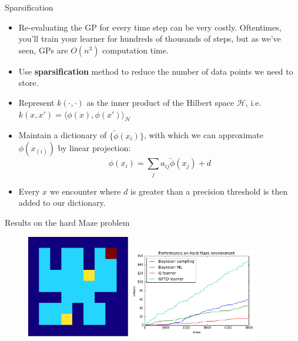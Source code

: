 \documentclass{beamer}
\begin{document}
\begin{frame}{Sparsification \cite{engel}}

\begin{itemize}
\item Re-evaluating the GP for every time step can be very costly. Oftentimes, you'll train your learner for hundreds of thousands of steps, but as we've seen, GPs are $O(n^3)$ computation time.
\item Use \textbf{sparsification} method to reduce the number of data points we need to store.
\item Represent $k(\cdot, \cdot)$ as the inner product of the Hilbert space $\mathcal{H}$, i.e.
$k(x, x') = \langle \phi(x), \phi(x') \rangle_{\mathcal{H}}$
\item Maintain
a dictionary of $\{\tilde{\phi}(x_i)\}$, with which we can approximate $\phi(x_{(i)})$ by linear projection:
$$\phi(x_i) = \sum_j a_{ij} \tilde{\phi}(x_j) + d$$
\item Every $x$ we encounter where $d$ is greater than a precision threshold is then added to our dictionary.
\end{itemize}
\end{frame}



\begin{frame}{Results on the hard Maze problem}
\begin{figure}[!htb]
\centering
\includegraphics[width=0.4\textwidth]{hardmaze}
\includegraphics[width=0.5\textwidth]{gptdCompare}
\end{figure}
\end{frame}
\end{document}
